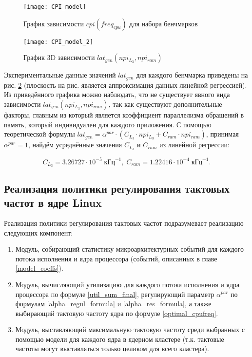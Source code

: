     \begin{figure}[!h]
        \caption{График зависимости $cpi(freq_{cpu})$ для набора бенчмарков}
        \centering
        \texttt{[image: CPI\_model]}
        \label{pic:cpi_model}
    \end{figure}

    \begin{figure}[!h]
        \caption{График 3D зависимости $lat_{gen}(npi_{L_3}, npi_{ram})$}
        \centering
        \texttt{[image: CPI\_model\_2]}
        \label{pic:cpi_model_2}
    \end{figure}

    Экспериментальные данные значений $lat_{gen}$ для каждого бенчмарка приведены на рис. \ref{pic:cpi_model_2}
    (плоскость на рис. является аппроксимация данных линейной регрессией). Из приведённого графика можно
    наблюдать, что не существует явного вида зависимости
    $lat_{gen}(npi_{L_3}, npi_{ram})$, так как существуют дополнительные факторы, главным из который
    является коэффициент параллелизма обращений в память, который индивидуален для каждого приложения.
    С помощью теоретической формулы
    $lat_{gen} = \alpha^{par} \cdot \left( C_{L_3} \cdot npi_{L_3} + C_{ram} \cdot npi_{ram} \right)$,
    принимая $\alpha^{par} = 1$,
    найдём усреднённые значения $C_{L_3}$ и $C_{ram}$ из линейной регрессии:

    \begin{equation}
        C_{L_3} = 3.26727 \cdot 10^{-5} \; \text{кГц}^{-1}, \; C_{ram} = 1.22416 \cdot 10^{-4} \; \text{кГц}^{-1}.
    \end{equation}

\subsection{Реализация политики регулирования тактовых частот в ядре Linux}

    Реализация политики регулирования тактовых частот подразумевает реализацию следующих компонент:
    \begin{enumerate}
        \item Модуль, собирающий статистику микроархитектурных событий для каждого потока исполнения
        и ядра процессора (событий, описанных в главе \ref{model_coeffs}).
        \item Модуль, вычисляющий утилизацию для каждого потока исполнения и ядра процессора по формуле
        \eqref{util_sum_final}, регулирующий параметр $\alpha^{par}$ по формулам \eqref{alpha_regul_formula}
        и \eqref{alpha_res_formula}, а также выбирающий тактовую частоту ядра по формуле
        \eqref{optimal_cpufreq}.
        \item Модуль, выставляющий максимальную тактовую частоту среди выбранных с помощью модели
        для каждого ядра в ядерном кластере (т.к. тактовые частоты могут выставляться только целиком
        для всего кластера).
    \end{enumerate}

